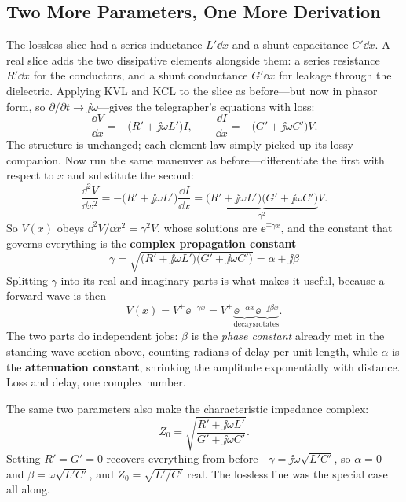 \subsection{Two More Parameters, One More Derivation}
The lossless slice had a series inductance \(L'\dd x\) and a shunt capacitance
\(C'\dd x\). A real slice adds the two dissipative elements alongside them: a
series resistance \(R'\dd x\) for the conductors, and a shunt conductance
\(G'\dd x\) for leakage through the dielectric. Applying KVL and KCL to the slice
as before---but now in phasor form, so \(\partial/\partial t\to\jj\omega\)---gives
the telegrapher's equations with loss:
\[
\frac{\dd V}{\dd x}=-\bigl(R'+\jj\omega L'\bigr)I,
\qquad
\frac{\dd I}{\dd x}=-\bigl(G'+\jj\omega C'\bigr)V .
\]
The structure is unchanged; each element law simply picked up its lossy companion.
Now run the same maneuver as before---differentiate the first with respect to
\(x\) and substitute the second:
\[
\frac{\dd^2V}{\dd x^2}
=-\bigl(R'+\jj\omega L'\bigr)\frac{\dd I}{\dd x}
=\underbrace{\bigl(R'+\jj\omega L'\bigr)\bigl(G'+\jj\omega C'\bigr)}_{\gamma^2}V .
\]
So \(V(x)\) obeys \(\dd^2V/\dd x^2=\gamma^2V\), whose solutions are
\(\ee^{\mp\gamma x}\), and the constant that governs everything is the
\textbf{complex propagation constant}
\[
\boxed{\;
\gamma=\sqrt{\bigl(R'+\jj\omega L'\bigr)\bigl(G'+\jj\omega C'\bigr)}
=\alpha+\jj\beta \;}
\]
Splitting \(\gamma\) into its real and imaginary parts is what makes it useful,
because a forward wave is then
\[
V(x)=V^{+}\ee^{-\gamma x}
=V^{+}\underbrace{\ee^{-\alpha x}}_{\text{decays}}
\underbrace{\ee^{-\jj\beta x}}_{\text{rotates}} .
\]
The two parts do independent jobs: \(\beta\) is the \emph{phase constant} already
met in the standing-wave section above, counting radians of delay per unit length, while
\(\alpha\) is the \textbf{attenuation constant}, shrinking the amplitude
exponentially with distance. Loss and delay, one complex number.

The same two parameters also make the characteristic impedance complex:
\[
Z_0=\sqrt{\frac{R'+\jj\omega L'}{G'+\jj\omega C'}} .
\]
Setting \(R'=G'=0\) recovers everything from before---\(\gamma=\jj\omega\sqrt{L'C'}\),
so \(\alpha=0\) and \(\beta=\omega\sqrt{L'C'}\), and \(Z_0=\sqrt{L'/C'}\) real. The
lossless line was the special case all along.

